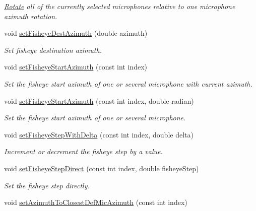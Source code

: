 \begin{DoxyCompactItemize}
\begin{DoxyCompactList}\small\item\em \hyperlink{class_hoa2_d_1_1_rotate}{Rotate} all of the currently selected microphones relative to one microphone azimuth rotation. \end{DoxyCompactList}\item 
void \hyperlink{class_hoa2_d_1_1_virtual_mic_manager_a1031b56d2f7bfc4a40ff5d5f478ae9a6}{set\-Fisheye\-Dest\-Azimuth} (double azimuth)
\begin{DoxyCompactList}\small\item\em Set fisheye destination azimuth. \end{DoxyCompactList}\item 
void \hyperlink{class_hoa2_d_1_1_virtual_mic_manager_ad41d6ca6482278a16e7121fc37b8f005}{set\-Fisheye\-Start\-Azimuth} (const int index)
\begin{DoxyCompactList}\small\item\em Set the fisheye start azimuth of one or several microphone with current azimuth. \end{DoxyCompactList}\item 
void \hyperlink{class_hoa2_d_1_1_virtual_mic_manager_a6351bacf0f305122062df4f69b7be6ee}{set\-Fisheye\-Start\-Azimuth} (const int index, double radian)
\begin{DoxyCompactList}\small\item\em Set the fisheye start azimuth of one or several microphone. \end{DoxyCompactList}\item 
void \hyperlink{class_hoa2_d_1_1_virtual_mic_manager_a8a470cb0bed6a99d97ed535717de3432}{set\-Fisheye\-Step\-With\-Delta} (const int index, double delta)
\begin{DoxyCompactList}\small\item\em Increment or decrement the fisheye step by a value. \end{DoxyCompactList}\item 
void \hyperlink{class_hoa2_d_1_1_virtual_mic_manager_a53cc4adb53136e44bed715e13ba5b834}{set\-Fisheye\-Step\-Direct} (const int index, double fisheye\-Step)
\begin{DoxyCompactList}\small\item\em Set the fisheye step directly. \end{DoxyCompactList}\item 
void \hyperlink{class_hoa2_d_1_1_virtual_mic_manager_af6543c15a67dffd32b66cfb5ba9d7d12}{set\-Azimuth\-To\-Closest\-Def\-Mic\-Azimuth} (const int index)

\end{DoxyCompactItemize}
